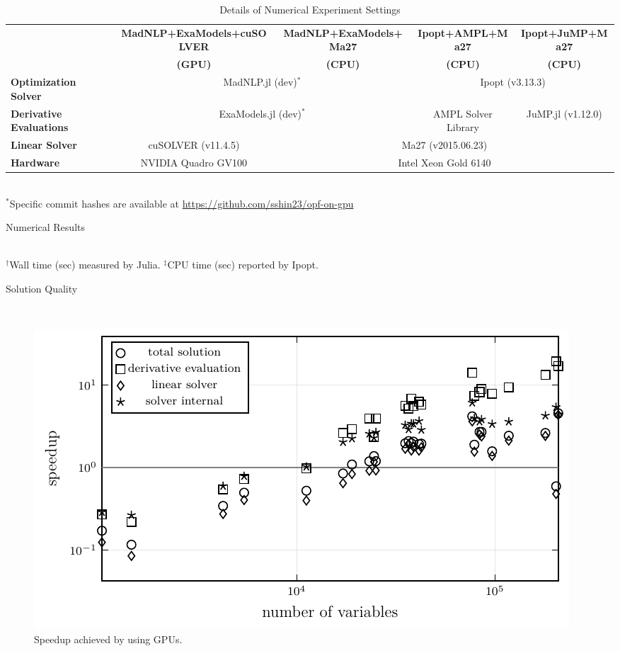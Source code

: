 \documentclass{IEEEtran4PSCC} %
\begin{document}
\begin{table}[t]
  \scriptsize
  \centering
  \caption{Details of Numerical Experiment Settings}
  \begin{tabular}{|l|c|c|c|c|}
    \hline
    & {\textbf{MadNLP+ExaModels+cuSOLVER}}
    & {\textbf{MadNLP+ExaModels+Ma27}}
    & {\textbf{Ipopt+AMPL+Ma27}}
    & {\textbf{Ipopt+JuMP+Ma27}}\\
    &\textbf{(GPU)} &\textbf{(CPU)} &\textbf{(CPU)}& \textbf{(CPU)}\\
    \hline
    \textbf{Optimization Solver} & \multicolumn{2}{c|}{MadNLP.jl (dev)$^*$} & \multicolumn{2}{c|}{Ipopt (v3.13.3)} \\
    \hline
    \textbf{Derivative Evaluations} & \multicolumn{2}{c|}{ExaModels.jl (dev)$^*$} &  AMPL Solver Library & JuMP.jl (v1.12.0)\\
    \hline
    \textbf{Linear Solver} &  cuSOLVER (v11.4.5) &\multicolumn{3}{c|}{Ma27 (v2015.06.23)}\\
    \hline
    \textbf{Hardware} & NVIDIA Quadro GV100 & \multicolumn{3}{c|}{Intel Xeon Gold 6140}\\
    \hline
  \end{tabular}\\
  $^*$Specific commit hashes are available at \url{https://github.com/sshin23/opf-on-gpu}
  \label{tbl:settings}
  \vspace{-.1in}
\end{table}
\begin{table}[t]
  \scriptsize
  \centering
  \caption{Numerical Results}
  \\
  $^\dag$Wall time (sec) measured by Julia. $^\ddag$CPU time (sec) reported by Ipopt.
  \label{tbl:results}
\end{table}
\begin{table}[t]
  \scriptsize
  \centering
  \caption{Solution Quality}
  \label{tbl:quality}
  \\
\end{table}
\begin{figure}[t]
  \centering
  \includegraphics[width=.4\textwidth]{speedup-sol.pdf}
  \vspace{-.1in}
  \caption{Speedup achieved by using GPUs.}
  \label{fig:speedup}
  \vspace{-.2in}
\end{figure}
\end{document}
